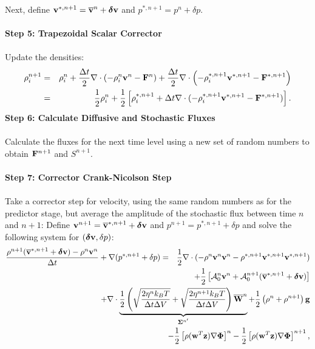 \documentclass[final]{siamltex}
\def\Fb {{\bf F}}
\def\gb {{\bf g}}
\def\vb {{\bf v}}
\def\wb {{\bf w}}
\def\Wb {{\bf W}}
\def\zb {{\bf z}}
\def\deltab {\boldsymbol{\delta}}
\def\Phib   {\boldsymbol{\Phi}}
\def\Sigmab {\boldsymbol{\Sigma}}
\def\half   {\frac{1}{2}}
\begin{document}
Next, define $\vb^{*,n+1} = \overline\vb^n + \deltab\vb$ and $p^{*,n+1} = p^n + \delta p$.\\ \\
{\bf Step 5: Trapezoidal Scalar Corrector}\\ \\
Update the densities:
\begin{eqnarray}
\rho_i^{n+1} &=&
\rho_i^n + \frac{\Delta t}{2}\nabla\cdot\left(-\rho_i^n\vb^n - \Fb^n\right) + \frac{\Delta t}{2}\nabla\cdot\left(-\rho_i^{*,n+1}\vb^{*,n+1} - \Fb^{*,n+1}\right)\nonumber\\
&=&  \half\rho_i^n + \half\left[\rho_i^{*,n+1} + \Delta t\nabla\cdot(-\rho_i^{*,n+1}\vb^{*,n+1} - \Fb^{*,n+1})\right].
\end{eqnarray}
{\bf Step 6: Calculate Diffusive and Stochastic Fluxes}\\ \\
Calculate the fluxes for the next time level using a new set of random numbers to obtain $\Fb^{n+1}$ and $S^{n+1}$.\\ \\
{\bf Step 7: Corrector Crank-Nicolson Step}\\ \\
Take a corrector step for velocity, using the same random numbers as for the predictor
stage, but average the amplitude of the stochastic flux between time $n$ and $n+1$:
Define $\vb^{n+1} = \overline\vb^{*,n+1} + \deltab\vb$ and $p^{n+1} = p^{*,n+1} + \delta p$ and
solve the following system for $(\deltab\vb,\delta p)$:
\begin{eqnarray}
\frac{\rho^{n+1}(\overline\vb^{*,n+1} + \deltab\vb) - \rho^n\vb^n}{\Delta t} + \nabla(p^{*,n+1}+\delta p) &=& \half\nabla\cdot(-\rho^n\vb^n\vb^n - \rho^{*,n+1}\vb^{*,n+1}\vb^{*,n+1})\nonumber\\
&&\hspace{-1.5in}+ \half\left[\mathcal{A}_0^n\vb^n + \mathcal{A}_0^{n+1}(\overline\vb^{*,n+1} + \deltab\vb)\right]\nonumber\\
&&\hspace{-1.5in}+ \nabla\cdot\underbrace{\half\left(\sqrt{\frac{2\eta^n k_B T}{\Delta t\Delta V}} + \sqrt{\frac{2\eta^{n+1} k_B T}{\Delta t\Delta V}}\right)\overline\Wb^n}_{\Sigmab^{n'}} + \half\left(\rho^n+\rho^{n+1}\right)\gb\nonumber\\
&&\hspace{-1.5in} - \half\left[\rho(\wb^T\zb)\nabla\Phib\right]^n - \half\left[\rho(\wb^T\zb)\nabla\Phib\right]^{n+1},
\end{eqnarray}
\end{document}
